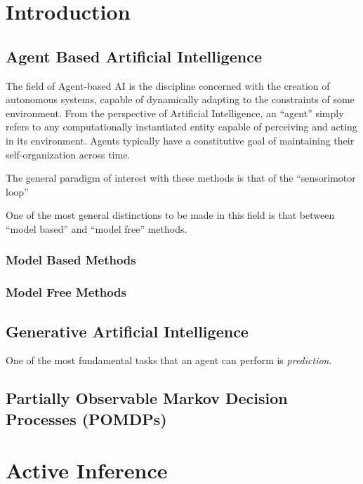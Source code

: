 \documentclass[onecolumn]{IEEEtran}
\begin{document}
\section{Introduction}

\subsection{Agent Based Artificial Intelligence}
The field of Agent-based AI is the discipline concerned with the creation of autonomous systems, capable of dynamically adapting to the constraints of some environment. From the perspective of Artificial Intelligence, an ``agent'' simply refers to any computationally instantiated entity capable of perceiving and acting in its environment. Agents typically have a constitutive goal of maintaining their self-organization across time.  

The general paradigm of interest with these methods is that of the ``sensorimotor loop''

One of the most general distinctions to be made in this field is that between ``model based'' and ``model free'' methods. 

\vspace{12pt}
\subsubsection{Model Based Methods}

\vspace{12pt}
\subsubsection{Model Free Methods}

\subsection{Generative Artificial Intelligence}
One of the most fundamental tasks that an agent can perform is \textit{prediction}.

\subsection{Partially Observable Markov Decision Processes (POMDPs)}

\section{Active Inference}
\end{document}
